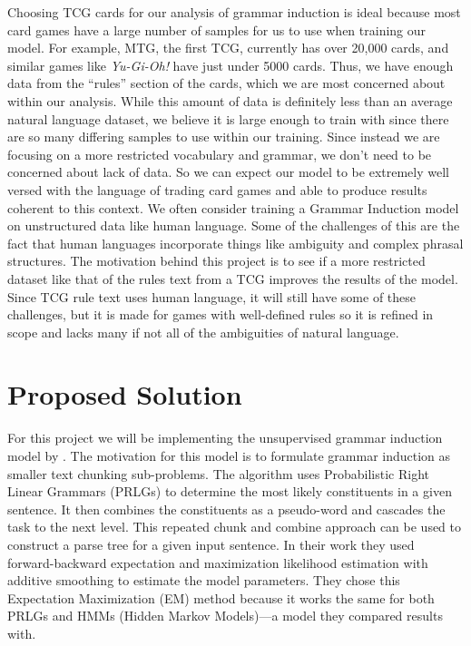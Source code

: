 \documentclass[11pt,a4paper]{article}
\begin{document}
Choosing TCG cards for our analysis of grammar induction is ideal because most card games have a large number of samples for us to use when training our model.
For example, MTG, the first TCG, currently has over 20,000 cards, and similar games like \emph{Yu-Gi-Oh!} have just under 5000 cards.
Thus, we have enough data from the “rules” section of the cards, which we are most concerned about within our analysis. While this amount of data is definitely less than an average natural language dataset, we believe it is large enough to train with since there are so many differing samples to use within our training.
Since instead we are focusing on a more restricted vocabulary and grammar, we don’t need to be concerned about lack of data.
So we can expect our model to be extremely well versed with the language of trading card games and able to produce results coherent to this context.
We often consider training a Grammar Induction model on unstructured data like human language.
Some of the challenges of this are the fact that human languages incorporate things like ambiguity and complex phrasal structures.
The motivation behind this project is to see if a more restricted dataset like that of the rules text from a TCG improves the results of the model.
Since TCG rule text uses human language, it will still have some of these challenges, but it is made for games with well-defined rules so it is refined in scope and lacks many if not all of the ambiguities of natural language.

\section{Proposed Solution}

For this project we will be implementing the unsupervised grammar induction model by \citet{ponvert-etal-2011-simple}.
The motivation for this model is to formulate grammar induction as smaller text chunking sub-problems.
The algorithm uses Probabilistic Right Linear Grammars (PRLGs) to determine the most likely constituents in a given sentence.
It then combines the constituents as a pseudo-word and cascades the task to the next level.
This repeated chunk and combine approach can be used to construct a parse tree for a given input sentence.
In their work they used forward-backward expectation and maximization likelihood estimation with additive smoothing to estimate the model parameters.
They chose this Expectation Maximization (EM) method because it works the same for both PRLGs and HMMs (Hidden Markov Models)—a model they compared results with.
\end{document}

